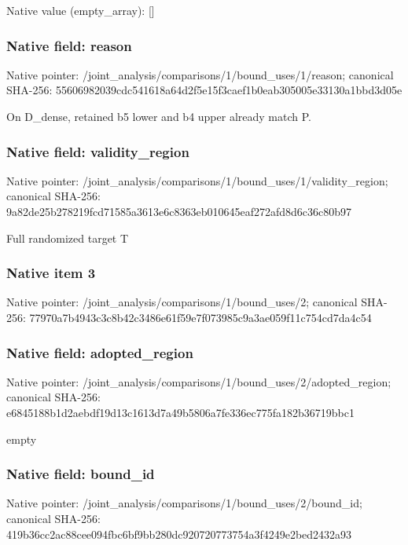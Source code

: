 \documentclass[10pt,a4paper]{article}
\begin{document}
Native value (empty\_\allowbreak{}array): []

\subsubsection{Native field: reason}
Native pointer: /joint\_\allowbreak{}analysis/comparisons/1/bound\_\allowbreak{}uses/1/reason; canonical SHA-256: 55606982039cdc541618a64d2f5e15f3caef1b0eab305005e33130a1bbd3d05e

\begingroup\raggedright\sloppy On D\_\allowbreak{}dense,\allowbreak{} retained b5 lower and b4 upper already match P.\par\endgroup

\subsubsection{Native field: validity\_\allowbreak{}region}
Native pointer: /joint\_\allowbreak{}analysis/comparisons/1/bound\_\allowbreak{}uses/1/validity\_\allowbreak{}region; canonical SHA-256: 9a82de25b278219fcd71585a3613e6c8363eb010645eaf272afd8d6c36c80b97

\begingroup\raggedright\sloppy Full randomized target T\par\endgroup

\subsubsection{Native item 3}
Native pointer: /joint\_\allowbreak{}analysis/comparisons/1/bound\_\allowbreak{}uses/2; canonical SHA-256: 77970a7b4943c3c8b42c3486e61f59e7f073985c9a3ae059f11c754cd7da4c54

\subsubsection{Native field: adopted\_\allowbreak{}region}
Native pointer: /joint\_\allowbreak{}analysis/comparisons/1/bound\_\allowbreak{}uses/2/adopted\_\allowbreak{}region; canonical SHA-256: e6845188b1d2aebdf19d13c1613d7a49b5806a7fe336ec775fa182b36719bbc1

\begingroup\raggedright\sloppy empty\par\endgroup

\subsubsection{Native field: bound\_\allowbreak{}id}
Native pointer: /joint\_\allowbreak{}analysis/comparisons/1/bound\_\allowbreak{}uses/2/bound\_\allowbreak{}id; canonical SHA-256: 419b36cc2ac88cee094fbc6bf9bb280dc920720773754a3f4249e2bed2432a93
\end{document}
